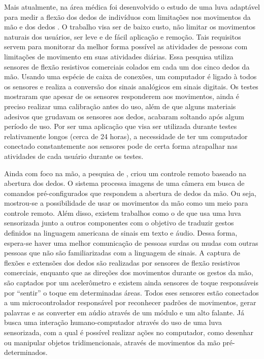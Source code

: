\documentclass[
	12pt,				%
	openright,			%
	oneside,			%
	a4paper,			%
	english,			%
	brazil				%
	]{abntex2}
\begin{document}
		Mais atualmente, na área médica foi desenvolvido o estudo de uma luva adaptável para medir a flexão dos dedos de indivíduos com limitações nos movimentos da mão e dos dedos \cite{simone2004lowcost}. O trabalho visa ser de baixo custo, não limitar os movimentos naturais dos usuários, ser leve e de fácil aplicação e remoção. Tais requisitos servem para monitorar da melhor forma possível as atividades de pessoas com limitações de movimento em suas atividades diárias. Essa pesquisa utiliza sensores de flexão resistivos comerciais colados em cada um dos cinco dedos da mão. Usando uma espécie de caixa de conexões, um computador é ligado à todos os sensores e realiza a conversão dos sinais analógicos em sinais digitais. Os testes mostraram que apesar de os sensores responderem aos movimentos, ainda é preciso realizar uma calibração antes do uso, além de que alguns materiais adesivos que grudavam os sensores aos dedos, acabaram soltando após algum período de uso. Por ser uma aplicação que visa ser utilizada durante testes relativamente longos (cerca de 24 horas), a necessidade de ter um computador conectado constantemente aos sensores pode de certa forma atrapalhar nas atividades de cada usuário durante os testes.		
		
		Ainda com foco na mão, a pesquisa de \cite{daeholee2009vision}, criou um controle remoto baseado na abertura dos dedos. O sistema processa imagens de uma câmera em busca de comandos pré-configurados que respondem a abertura de dedos da mão. Ou seja, mostrou-se a possibilidade de usar os movimentos da mão como um meio para controle remoto. Além disso, existem trabalhos como o de \cite{anbarasi2013deafmute} que usa uma luva sensorizada junto a outros componentes com o objetivo de traduzir gestos definidos na linguagem americana de sinais em texto e áudio. Dessa forma, espera-se haver uma melhor comunicação de pessoas surdas ou mudas com outras pessoas que não são familiarizadas com a linguagem de sinais. A captura de flexões e extensões dos dedos são realizadas por sensores de flexão resistivos comerciais, enquanto que as direções dos movimentos durante os gestos da mão, são captados por um acelerômetro e existem ainda sensores de toque responsáveis por ``sentir'' o toque em determinadas áreas. Todos eses sensores estão conectados a um microcontrolador responsável por reconhecer padrões de movimentos, gerar palavras e as converter em aúdio através de um módulo e um alto falante. Já \cite{kumar2012hci} busca uma interação humano-computador através do uso de uma luva sensorizada, com a qual é possível realizar ações no computador, como desenhar ou manipular objetos tridimencionais, através de movimentos da mão pré-determinados.
		
\end{document}
